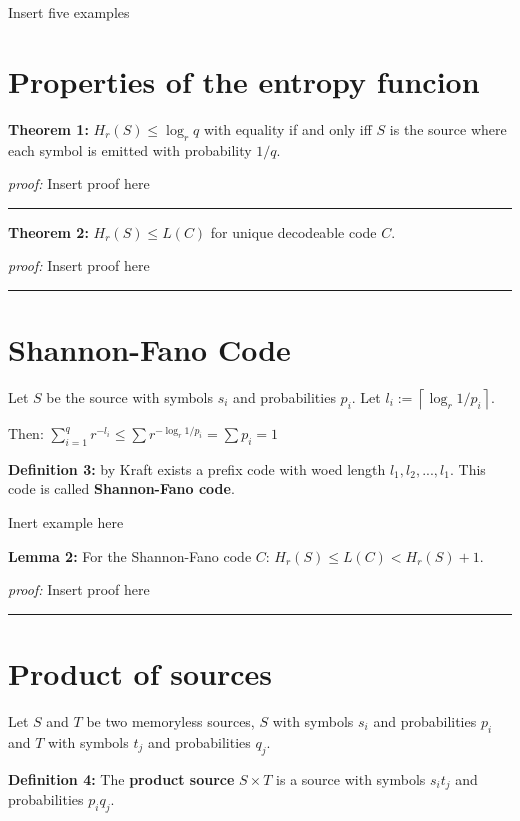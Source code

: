 \documentclass{article}
\begin{document}
Insert five examples

	\section{Properties of the entropy funcion}
	
\noindent \textbf{Theorem  1:}  $H_{r}(S) \leq \log_{r}{q}$ with equality if and only iff $S$ is the source where each symbol is emitted with probability $1/q$.

\noindent\textit{proof:}  Insert proof here

\noindent
{\color{gray} \rule{\linewidth}{0.5mm} }

\noindent \textbf{Theorem  2:}  $H_{r}(S) \leq L(C)$ for unique decodeable code $C$.

\noindent\textit{proof:}  Insert proof here

\noindent
{\color{gray} \rule{\linewidth}{0.5mm} }


	\section{Shannon-Fano Code}

\noindent Let $S$ be the source with symbols $s_i$ and probabilities $p_i$. Let $l_i := \left\lceil \log_{r}{1/p_i} \right\rceil$. 


\noindent Then: $\sum_{i = 1}^{q}{r^{-l_i}} \leq \sum r^{- \log_{r}{1/p_i}} = \sum p_i = 1$

\noindent \textbf{Definition 	3:} by Kraft exists a prefix code with woed length $l_1, l_2, ..., l_1$. This code is called \textbf{Shannon-Fano code}.

Inert example here


\noindent \textbf{Lemma 	2:}  For the Shannon-Fano code $C$: $H_{r}(S) \leq L(C) < H_{r}(S) + 1$.

\noindent\textit{proof:}  Insert proof here

\noindent
{\color{gray} \rule{\linewidth}{0.5mm} }



	\section{Product of sources}
	
\noindent Let $S$ and $T$ be two memoryless sources, $S$ with symbols $s_i$ and probabilities $p_i$ and $T$ with symbols $t_j$ and probabilities $q_j$.

\noindent \textbf{Definition 	4:} The \textbf{product source} $S \times T$ is a source with symbols $s_{i}t_{j}$ and probabilities $p_{i}q_{j}$.
\end{document}

